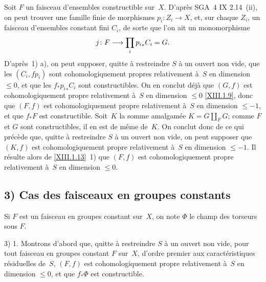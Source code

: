 Soit $F$ un faisceau d'ensembles constructible sur~$X$. D'apr\`es
SGA~4 IX 2.14~(ii), on peut trouver une famille finie de morphismes
$p_i \colon Z_i \to X$, et, sur chaque $Z_i$, un faisceau d'ensembles
constant fini $C_i$, de sorte que l'on ait un monomorphisme
$$
j \colon F \to \prod_{i} {p_i}_* C_i =G \quoi.
$$
D'apr\`es~1) a),
on peut supposer, quitte \`a restreindre $S$ \`a un ouvert non
vide, que les $(C_i,fp_i)$ sont cohomologiquement propres relativement
\`a~$S$ en dimension $\le 0$, et que les $f_*{p_i}_*C_i$ sont
constructibles. On en conclut d\'ej\`a que $(G,f)$ est
cohomologiquement propre relativement \`a~$S$ en dimension $\le 0$
\eqref{XIII.1.9}, donc que $(F,f)$ est cohomologiquement propre
relativement \`a~$S$ en dimension $\le -1$, et que $f_*F$ est
constructible. Soit~$K$ la somme amalgam\'ee $K= G \coprod_{F} G$;
comme $F$ et $G$ sont constructibles, il en est de m\^eme de~$K$. On
conclut donc de ce qui pr\'ec\`ede que, quitte \`a restreindre
$S$ \`a un ouvert non vide, on peut supposer que $(K,f)$ est
cohomologiquement propre relativement \`a~$S$ en dimension $\le
-1$. Il r\'esulte alors de \ref{XIII.1.13}~1) que $(F,f)$ est
cohomologiquement propre relativement \`a~$S$ en dimension $\le 0$.

\subsection*{3) Cas des faisceaux en groupes constants}

Si $F$ est un faisceau en groupes constant sur~$X$, on note $\Phi$ le
champ des torseurs sous $F$.

3) 1. Montrons d'abord que, quitte \`a restreindre $S$ \`a un
ouvert non vide, pour tout faisceau en groupes constant $F$ sur~$X$,
d'ordre premier aux caract\'eristiques r\'esiduelles de~$S$,
$(F,f)$ est cohomologiquement propre relativement \`a~$S$ en
dimension $\le 0$, et que $f_*\Phi$ est constructible.

